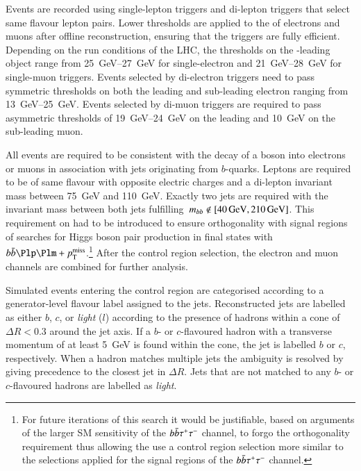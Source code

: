 Events are recorded using single-lepton triggers and di-lepton
triggers that select same flavour lepton pairs. Lower thresholds are
applied to the \pT of electrons and muons after offline
reconstruction, ensuring that the triggers are fully
efficient. Depending on the run conditions of the LHC, the \pT
thresholds on the \pT-leading object range from \SIrange{25}{27}{\GeV}
for single-electron and \SIrange{21}{28}{\GeV} for single-muon
triggers. Events selected by di-electron triggers need to pass
symmetric \pT thresholds on both the leading and sub-leading electron
ranging from \SIrange{13}{25}{\GeV}. Events selected by di-muon
triggers are required to pass asymmetric thresholds of
\SIrange{19}{24}{\GeV} on the leading and \SI{10}{\GeV} on the
sub-leading muon.

All events are required to be consistent with the decay of a \PZ boson
into electrons or muons in association with jets originating from
$b$-quarks. Leptons are required to be of same flavour with opposite
electric charges and a di-lepton invariant mass between \SI{75}{\GeV}
and \SI{110}{\GeV}. Exactly two \btagged jets are required with the
invariant mass between both jets
fulfilling~$\mBB \not\in [\SI{40}{\GeV}, \SI{210}{\GeV}]$. This
requirement on \mBB had to be introduced to ensure orthogonality with
signal regions of searches for Higgs boson pair production in final
states with $\bbbar\Plp\Plm + \pTmissAbs$.\footnote{For future
  iterations of this search it would be justifiable, based on
  arguments of the larger SM \HH sensitivity of the
  $b\bar{b}\tau^{+}\tau^{-}$ channel, to forgo the orthogonality
  requirement thus allowing the use a \ZHF control region selection
  more similar to the selections applied for the signal regions of the
  $b\bar{b}\tau^{+}\tau^{-}$ channel.} After the \ZHF control region
selection, the electron and muon channels are combined for further
analysis.

Simulated \Zjets events entering the \ZHF control region are
categorised according to a generator-level flavour label assigned to
the \btagged jets. Reconstructed jets are labelled as either $b$, $c$,
or \emph{light} ($l$) according to the presence of hadrons within a
cone of $\Delta R < 0.3$ around the jet axis. If a $b$- or
$c$-flavoured hadron with a transverse momentum of at least
\SI{5}{\GeV} is found within the cone, the jet is labelled $b$ or $c$,
respectively. When a hadron matches multiple jets the ambiguity is
resolved by giving precedence to the closest jet in $\Delta R$. Jets
that are not matched to any $b$- or $c$-flavoured hadrons are labelled
as \emph{light}.

